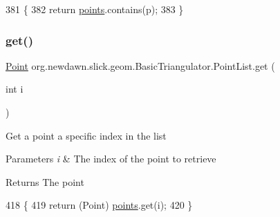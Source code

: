 \begin{DoxyCode}
381                                          \{
382             \textcolor{keywordflow}{return} \mbox{\hyperlink{classorg_1_1newdawn_1_1slick_1_1geom_1_1_basic_triangulator_1_1_point_list_afc89fd9387b7c0663eda4f928e610b8a}{points}}.contains(p);
383         \}
\end{DoxyCode}
\mbox{\label{classorg_1_1newdawn_1_1slick_1_1geom_1_1_basic_triangulator_1_1_point_list_ae1c25c4d9e9a4064036b06328cb14b2d}} 
\subsubsection{\texorpdfstring{get()}{get()}}
{\footnotesize\ttfamily \mbox{\hyperlink{classorg_1_1newdawn_1_1slick_1_1geom_1_1_basic_triangulator_1_1_point}{Point}} org.\+newdawn.\+slick.\+geom.\+Basic\+Triangulator.\+Point\+List.\+get (\begin{DoxyParamCaption}\item[{int}]{i }\end{DoxyParamCaption})\hspace{0.3cm}{\ttfamily [inline]}}

Get a point a specific index in the list


\begin{DoxyParams}{Parameters}
{\em i} & The index of the point to retrieve \\
\hline
\end{DoxyParams}
\begin{DoxyReturn}{Returns}
The point 
\end{DoxyReturn}

\begin{DoxyCode}
418                                 \{
419             \textcolor{keywordflow}{return} (Point) \mbox{\hyperlink{classorg_1_1newdawn_1_1slick_1_1geom_1_1_basic_triangulator_1_1_point_list_afc89fd9387b7c0663eda4f928e610b8a}{points}}.get(i);
420         \}
\end{DoxyCode}
\mbox{\label{classorg_1_1newdawn_1_1slick_1_1geom_1_1_basic_triangulator_1_1_point_list_a42078869a9395d326f70fbccdbea8012}} 
